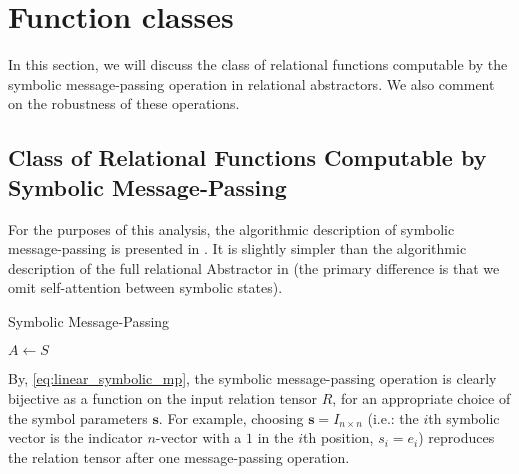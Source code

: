 \def\rdot{\bigcdot}
\def\F{{\mathfrak{F}}}

\section{Function classes}
\label{sec:function_spaces}

In this section, we will discuss the class of relational functions computable by the symbolic message-passing operation in relational abstractors. We also comment on the robustness of these operations.

\subsection{Class of Relational Functions Computable by Symbolic Message-Passing}
\label{ssec:function_class_symbolic_mp}
For the purposes of this analysis, the algorithmic description of symbolic message-passing is presented in . It is slightly simpler than the algorithmic description of the full relational Abstractor in  (the primary difference is that we omit self-attention between symbolic states).

\begin{algorithm}[ht!]
	\caption{Symbolic Message-Passing}\label{alg:symbolic_mp}
	
	\vspace{1em}
	
	$A \gets S$
	
\end{algorithm}



By, \cref{eq:linear_symbolic_mp}, the symbolic message-passing operation is clearly bijective as a function on the input relation tensor $R$, for an appropriate choice of the symbol parameters $\boldsymbol{s}$. For example, choosing $\boldsymbol{s} = I_{n \times n}$ (i.e.: the $i$th symbolic vector is the indicator $n$-vector with a $1$ in the $i$th position, $s_i = e_i$) reproduces the relation tensor after one message-passing operation. 

